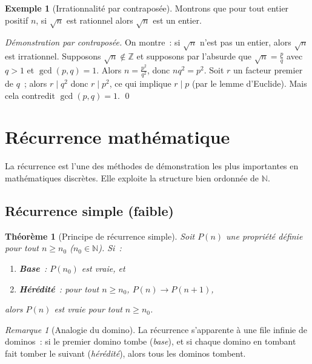 \documentclass[12pt,a4paper,openany]{book}
\theoremstyle{definition}
\newtheorem{exemple}[definition]{Exemple}
\theoremstyle{plain}
\newtheorem{theoreme}[definition]{Théorème}
\theoremstyle{remark}
\newtheorem{remarque}[definition]{Remarque}
\newcommand{\N}{\mathbb{N}}
\newcommand{\Z}{\mathbb{Z}}
\begin{document}
\begin{exemple}[Irrationnalit\'e par contrapos\'ee]\label{ex:contrap-irr}
  Montrons que pour tout entier positif $n$, si $\sqrt{n}$ est rationnel alors $\sqrt{n}$ est un entier.

  \smallskip
  \noindent\textit{D\'emonstration par contrapos\'ee.} On montre~: si $\sqrt{n}$ n'est pas un entier, alors $\sqrt{n}$ est irrationnel. Supposons $\sqrt{n} \notin \Z$ et supposons par l'absurde que $\sqrt{n} = \frac{p}{q}$ avec $q > 1$ et $\gcd(p,q) = 1$. Alors $n = \frac{p^2}{q^2}$, donc $nq^2 = p^2$. Soit $r$ un facteur premier de $q$~; alors $r \mid q^2$ donc $r \mid p^2$, ce qui implique $r \mid p$ (par le lemme d'Euclide). Mais cela contredit $\gcd(p,q)=1$. \qed
\end{exemple}

\section{R\'ecurrence math\'ematique}
\label{sec:recurrence}

La r\'ecurrence est l'une des m\'ethodes de d\'emonstration les plus importantes en math\'ematiques discr\`etes. Elle exploite la structure bien ordonn\'ee de $\N$.

\subsection{R\'ecurrence simple (faible)}
\label{subsec:recurrence-simple}

\begin{theoreme}[Principe de r\'ecurrence simple]\label{thm:recurrence-simple}
  Soit $P(n)$ une propri\'et\'e d\'efinie pour tout $n \geq n_0$ ($n_0 \in \N$). Si~:
  \begin{enumerate}[label=(\roman*)]
    \item \textbf{Base}~: $P(n_0)$ est vraie, et
    \item \textbf{H\'er\'edit\'e}~: pour tout $n \geq n_0$, $P(n) \to P(n+1)$,
  \end{enumerate}
  alors $P(n)$ est vraie pour tout $n \geq n_0$.
\end{theoreme}

\begin{remarque}[Analogie du domino]\label{rem:domino}
  La r\'ecurrence s'apparente \`a une file infinie de dominos~: si le premier domino tombe (\textit{base}), et si chaque domino en tombant fait tomber le suivant (\textit{h\'er\'edit\'e}), alors tous les dominos tombent.
\end{remarque}
\end{document}
